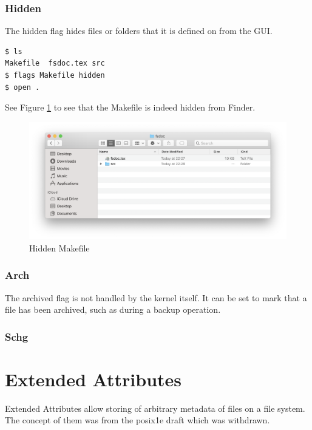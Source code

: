 \documentclass[a4paper]{article}
\begin{document}
\subsubsection{Hidden}

The hidden flag hides files or folders that it is defined on from the GUI. 

\begin{verbatim}
$ ls
Makefile  fsdoc.tex src
$ flags Makefile hidden
$ open .
\end{verbatim}

See Figure \ref{fig:macoshidden} to see that the Makefile is indeed hidden from Finder.

\begin{figure}
\centering\caption{Hidden Makefile}\label{fig:macoshidden}
\includegraphics[width=12cm]{img/hidden}  
\end{figure}

\subsubsection{Arch}

The archived flag is not handled by the kernel itself. It can be set to mark that a file has been archived, such as during a backup operation.

\subsubsection{Schg}

\section{Extended Attributes}

Extended Attributes allow storing of arbitrary metadata of files on a file system. The concept of them was from the \gls{posix}\.1e draft which was withdrawn.

\end{document}
